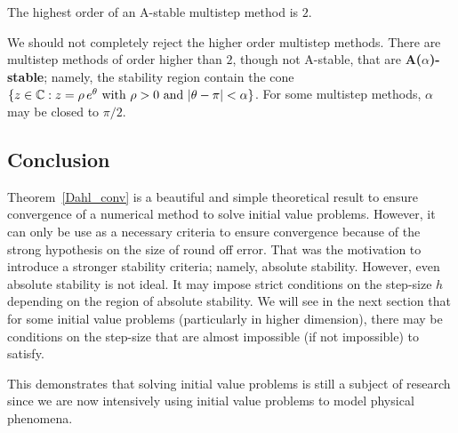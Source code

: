 \begin{theorem}
The highest order of an A-stable multistep method is $2$.
\label{Dahl2ndB}
\end{theorem}

\begin{rmk}
We should not completely reject the higher order multistep methods.
There are multistep methods of order higher than $2$, though not
A-stable, that are
{\bfseries A($\alpha$)-stable};
namely, the stability region contain the cone
$\{ z \in \mathbb{C} : z = \rho\,e^\theta \ \text{with $\rho>0$ and
$|\theta-\pi|<\alpha$} \}$.  For some multistep methods, $\alpha$ may
be closed to $\pi/2$.
\end{rmk}



\subsection{Conclusion}

Theorem~\ref{Dahl_conv} is a beautiful and simple theoretical result
to ensure convergence of a numerical method to solve initial value
problems.  However, it can only be use as a necessary criteria to
ensure convergence because of the strong hypothesis on the size of
round off error.  That was the motivation to introduce a stronger
stability criteria; namely, absolute stability.  However, even
absolute stability is not ideal.  It may impose strict conditions on
the step-size $h$ depending on the region of absolute stability.  We
will see in the next section that for some initial value problems
(particularly in higher dimension), there may be conditions on the
step-size that are almost impossible (if not impossible) to satisfy.

This demonstrates that solving initial value problems is still a
subject of research since we are now intensively using initial value
problems to model physical phenomena.

